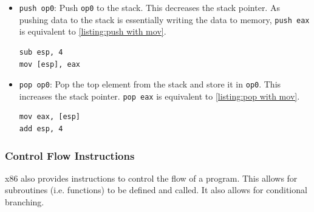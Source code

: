 \begin{itemize}
    \item \texttt{push op0}: Push \texttt{op0} to the stack. This decreases the stack pointer. As pushing data to the stack is essentially writing the data to memory, \texttt{push eax} is equivalent to \autoref{listing:push with mov}.

\begin{lstlisting}[caption={The \texttt{push eax} instruction written in terms of \texttt{sub} and \texttt{mov}.}, captionpos=b, label={listing:push with mov}]
sub esp, 4
mov [esp], eax
\end{lstlisting}

    \item \texttt{pop op0}: Pop the top element from the stack and store it in \texttt{op0}. This increases the stack pointer. \texttt{pop eax} is equivalent to \autoref{listing:pop with mov}.

\begin{lstlisting}[caption={The \texttt{pop eax} instruction written in terms of \texttt{mov} and \texttt{add}.}, captionpos=b, label={listing:pop with mov}]
mov eax, [esp]
add esp, 4
\end{lstlisting}

\end{itemize}

\subsubsection{Control Flow Instructions}\label{section:control flow instructions}
x86 also provides instructions to control the flow of a program. This allows for subroutines (i.e. functions) to be defined and called. It also allows for conditional branching.

